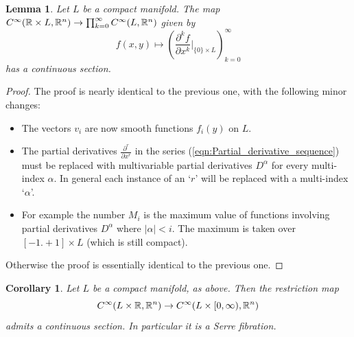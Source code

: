 \documentclass{article}
\newtheorem{lemma}[theorem]{Lemma}
\newtheorem{corollary}[theorem]{Corollary}
\newtheorem{proposed work}[theorem]{Proposed Work}
\theoremstyle{definition}
\begin{document}
\begin{lemma} \label{lma:Extend_Derivatives_to_function}
	Let $L$ be a compact manifold. The map $C^\infty(\mathbb R \times L, \mathbb R^n) \to \prod_{k=0}^\infty C^\infty(L, \mathbb R^n)$ given by
	\begin{equation*}
		f(x,y) \mapsto \left( \frac{\partial^k f}{\partial x^k}  |_{\{0\}\times L} \right)_{k=0}^\infty
	\end{equation*}
	has a continuous section. 
\end{lemma}

\begin{proof}
	The proof is nearly identical to the previous one, with the following minor changes:
	\begin{itemize}
		\item The vectors $v_i$ are now smooth functions $f_i(y)$ on $L$. 
		\item The partial derivatives $\frac{\partial^r}{\partial x^r}$ in the series (\ref{eqn:Partial_derivative_sequence}) must be replaced with multivariable partial derivatives $D^\alpha$ for every multi-index $\alpha$. In general each instance of an `$r$' will be replaced with a multi-index `$\alpha$'.
		\item For example the number $M_i$ is the maximum value of functions involving partial derivatives $D^\alpha$ where $|\alpha| < i$. The maximum is taken over $[-1.+1] \times L$ (which is still compact).  
	\end{itemize}
	Otherwise the proof is essentially identical to the previous one. 
\end{proof}

\begin{corollary} \label{cor:Compact_extension_of_function}
	Let $L$ be a compact manifold, as above. Then the restriction map 
	\begin{equation*}
		C^\infty(L \times \mathbb R, \mathbb R^n) \to C^\infty(L \times [0,\infty), \mathbb R^n)
	\end{equation*}
	admits a continuous section. In particular it is a Serre fibration. 
\end{corollary}
\end{document}

